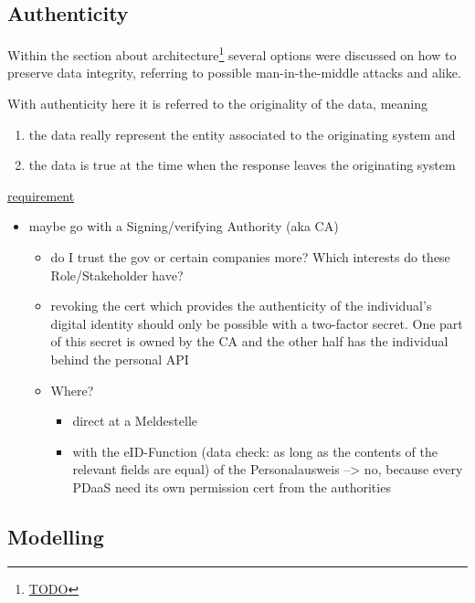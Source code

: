 \documentclass[12pt,english,a4paper,titlepage,cleardoublepage=empty,dottedtoc]{report}
\renewcommand{\href}[2]{#2\footnote{\url{#1}}}
\providecommand{\tightlist}{%
  \setlength{\itemsep}{0pt}\setlength{\parskip}{0pt}}
\begin{document}
\subsection{Authenticity}\label{authenticity}

Within the section \href{TODO}{about architecture} several options were
discussed on how to preserve data integrity, referring to possible
man-in-the-middle attacks and alike.

With authenticity here it is referred to the originality of the data,
meaning

\begin{enumerate}
\def\labelenumi{(\Alph{enumi})}
\tightlist
\item
  the data really represent the entity associated to the originating
  system and
\item
  the data is true at the time when the response leaves the originating
  system
\end{enumerate}

\protect\hyperlink{sa04}{requirement}

\begin{itemize}
\tightlist
\item
  maybe go with a Signing/verifying Authority (aka CA)

  \begin{itemize}
  \tightlist
  \item
    do I trust the gov or certain companies more? Which interests do
    these Role/Stakeholder have?
  \item
    revoking the cert which provides the authenticity of the
    individual's digital identity should only be possible with a
    two-factor secret. One part of this secret is owned by the CA and
    the other half has the individual behind the personal API
  \item
    Where?

    \begin{itemize}
    \tightlist
    \item
      direct at a Meldestelle
    \item
      with the eID-Function (data check: as long as the contents of the
      relevant fields are equal) of the Personalausweis --\textgreater{}
      no, because every PDaaS need its own permission cert from the
      authorities
    \end{itemize}
  \end{itemize}
\end{itemize}

\subsection{Modelling}\label{modelling}
\end{document}
